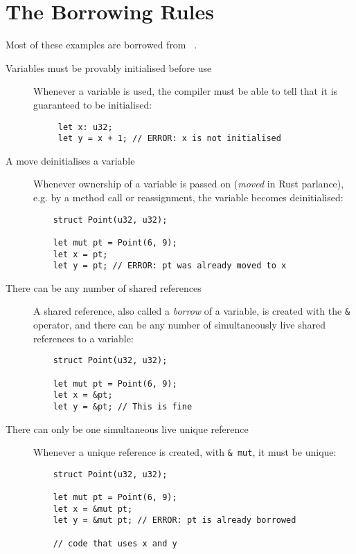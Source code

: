 \documentclass{UUThesisTemplate}
\newcommand{\InRust}[1]{\texttt{#1}}
\begin{document}
\section{The Borrowing Rules}\label{sec:borrowing-rules}



Most of these examples are borrowed from
\citeauthor{weiss_oxide:_2019}~\cite{weiss_oxide:_2019}.

\begin{description}  
\item[Variables must be provably initialised before use] Whenever a variable is
  used, the compiler must be able to tell that it is guaranteed to be
  initialised:
  \begin{verbatim}
     let x: u32;
     let y = x + 1; // ERROR: x is not initialised
  \end{verbatim}
\item[A move deinitialises a variable] Whenever ownership of a variable is
  passed on (\emph{moved} in Rust parlance), e.g. by a method call or
  reassignment, the variable becomes deinitialised:
  \begin{verbatim}
    struct Point(u32, u32);
    
    let mut pt = Point(6, 9);
    let x = pt;
    let y = pt; // ERROR: pt was already moved to x
  \end{verbatim}
\item[There can be any number of shared references] A shared reference, also
  called a \textit{borrow} of a variable, is created with the \InRust{&}
  operator, and there can be any number of simultaneously live shared references
  to a variable:
  \begin{verbatim}
    struct Point(u32, u32);
    
    let mut pt = Point(6, 9);
    let x = &pt;
    let y = &pt; // This is fine
  \end{verbatim}
\item[There can only be one simultaneous live unique reference] Whenever a
  unique reference is created, with \InRust{& mut}, it must be unique:
  \begin{verbatim}
    struct Point(u32, u32);
    
    let mut pt = Point(6, 9);
    let x = &mut pt;
    let y = &mut pt; // ERROR: pt is already borrowed
    
    // code that uses x and y
  \end{verbatim}


\end{description}
\end{document}
